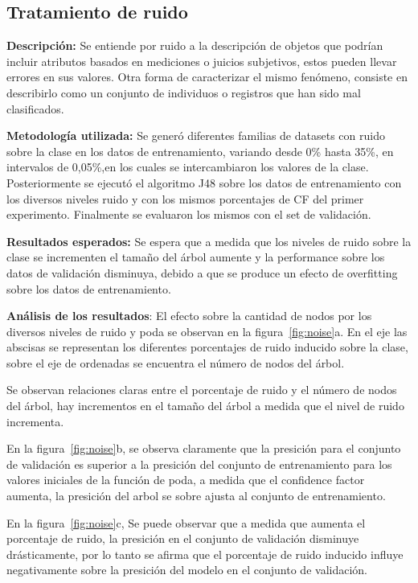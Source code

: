\subsection{Tratamiento de ruido}

\textbf{Descripción:} Se entiende por ruido a la descripción de objetos que podrían incluir
atributos basados en mediciones o juicios subjetivos, estos pueden llevar 
errores en sus valores. Otra forma de caracterizar el mismo fenómeno, consiste en
describirlo como un conjunto de individuos o registros que han sido mal clasificados.

\textbf{Metodología utilizada:} Se generó diferentes familias de datasets con ruido sobre la clase en los datos
de entrenamiento, variando desde 0\% hasta 35\%, en intervalos de 0,05\%,en los cuales
se intercambiaron los valores de la clase.
Posteriormente se ejecutó el algoritmo J48 sobre los datos de entrenamiento con los
diversos niveles ruido y con los mismos porcentajes de CF del primer experimento.
Finalmente se evaluaron los mismos con el set de validación.

\textbf{Resultados esperados:} Se espera que a medida que los niveles de ruido sobre la clase
se incrementen el tamaño del árbol aumente y la performance sobre los datos de
validación disminuya, debido a que se produce un efecto de overfitting sobre los datos de
entrenamiento.

\textbf{Análisis de los resultados}: El efecto sobre la cantidad de nodos por los diversos niveles
de ruido y poda se observan en la figura~\ref{fig:noise}a.
En el eje las abscisas se representan los
diferentes porcentajes de ruido inducido sobre la clase,
sobre el eje de ordenadas se encuentra el número de nodos del árbol.

Se observan relaciones claras entre el porcentaje de ruido y
el número de nodos del árbol,  hay incrementos 
en el tamaño del árbol a medida que el nivel de ruido incrementa.

En la figura~\ref{fig:noise}b,
se observa claramente que la presición para el 
conjunto de validación es superior a la presición del conjunto de entrenamiento 
para los valores iniciales de la función de poda, a medida que el confidence factor
aumenta, la presición del arbol se sobre ajusta al conjunto de entrenamiento.

En la figura~\ref{fig:noise}c,
Se puede observar que a medida que aumenta el porcentaje de 
ruido, la presición en el conjunto de validación disminuye drásticamente,
por lo tanto se afirma que el porcentaje de ruido inducido influye negativamente 
sobre la presición del modelo en el conjunto de validación.


